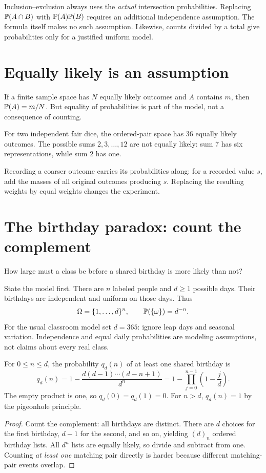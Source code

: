 \begin{warningbox}
Inclusion--exclusion always uses the \emph{actual} intersection
probabilities. Replacing $\P(A\cap B)$ with $\P(A)\P(B)$ requires an
additional independence assumption. The formula itself makes no such
assumption. Likewise, counts divided by a total give probabilities only
for a justified uniform model.
\end{warningbox}

\section{Equally likely is an assumption}

If a finite sample space has $N$ equally likely outcomes and $A$ contains $m$, then $\P(A)=m/N$. But equality of probabilities is part of the model, not a consequence of counting.

\begin{example}
For two independent fair dice, the ordered-pair space has 36 equally likely outcomes. The possible sums $2,3,\ldots,12$ are not equally likely: sum 7 has six representations, while sum 2 has one.
\end{example}

Recording a coarser outcome carries its probabilities along: for a recorded
value $s$, add the masses of all original outcomes producing $s$.
Replacing the resulting weights by equal weights changes the experiment.

\section{The birthday paradox: count the complement}
\label{sec:birthday}

\begin{question}
How large must a class be before a shared birthday is more likely than not?
\end{question}

State the model first. There are $n$ labeled people and $d\ge1$ possible days.
Their birthdays are independent and uniform on those days. Thus
\[
\Omega=\{1,\ldots,d\}^n,\qquad \P(\{\omega\})=d^{-n}.
\]
For the usual classroom model set $d=365$: ignore leap days and seasonal
variation. Independence and equal daily probabilities are modeling
assumptions, not claims about every real class.

\begin{proposition}
For $0\le n\le d$, the probability $q_d(n)$ of at least one shared
birthday is
\[
q_d(n)=1-\frac{d(d-1)\cdots(d-n+1)}{d^n}
      =1-\prod_{j=0}^{n-1}\left(1-\frac jd\right).
\]
The empty product is one, so $q_d(0)=q_d(1)=0$.
For $n>d$, $q_d(n)=1$ by the pigeonhole principle.
\end{proposition}
\begin{proof}
Count the complement: all birthdays are distinct. There are $d$ choices
for the first birthday, $d-1$ for the second, and so on, yielding $(d)_n$
ordered birthday lists. All $d^n$ lists are equally likely, so divide and
subtract from one. Counting \emph{at least one} matching pair directly is
harder because different matching-pair events overlap.
\end{proof}

